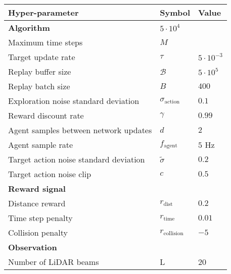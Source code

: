 
\begin{table}[htb!]
\centering
\small
\begin{tabularx}{0.95\textwidth}{RCL} 
    \hline
    \textbf{Hyper-parameter} & \textbf{Symbol} & \textbf{Value} \\ 
    \hline
    \textbf{Algorithm}                      & $5 \cdot 10^{4}$          & \\
    Maximum time steps                      & $M$                       &  \\
    Target update rate                      & $\tau$                    & $5\cdot10^{-3}$ \\
    Replay buffer size                      & $\mathcal{B}$             & $5\cdot 10^5$ \\
    Replay batch size                       & $B$                       & $400$ \\
    Exploration noise standard deviation    & $\sigma_{\text{action}}$  & $0.1$ \\
    Reward discount rate                    & $\gamma$                  & $0.99$ \\
    Agent samples between network updates   & $d$                       & $2$ \\
    Agent sample rate                       & $f_{\text{agent}}$        & $5$ Hz \\
    Target action noise standard deviation  & $\tilde{\sigma}$          & $0.2$ \\ 
    Target action noise clip                & $c$                       & $0.5$ \\
    \textbf{Reward signal}                  &                           & \\
    Distance reward                         & $r_{\text{dist}}$         & $0.2$ \\ 
    Time step penalty                       & $r_{\text{time}}$         & $0.01$ \\
    Collision penalty                       & $r_{\text{collision}}$    & $-5$ \\
    \textbf{Observation}                    &                           & \\
    Number of LiDAR beams                   & L                         & 20 \\

\end{tabularx}
\end{table}

